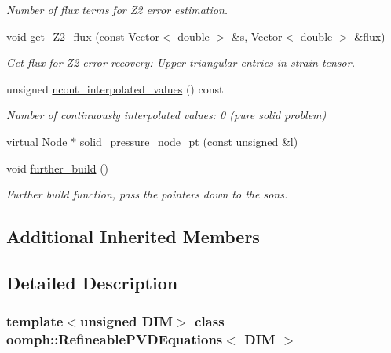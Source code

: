 \begin{DoxyCompactItemize}
\begin{DoxyCompactList}\small\item\em Number of \textquotesingle{}flux\textquotesingle{} terms for Z2 error estimation. \end{DoxyCompactList}\item 
void \hyperlink{classoomph_1_1RefineablePVDEquations_a1e51d4ea46f49c62441425bc3883a589}{get\+\_\+\+Z2\+\_\+flux} (const \hyperlink{classoomph_1_1Vector}{Vector}$<$ double $>$ \&\hyperlink{cfortran_8h_ab7123126e4885ef647dd9c6e3807a21c}{s}, \hyperlink{classoomph_1_1Vector}{Vector}$<$ double $>$ \&flux)
\begin{DoxyCompactList}\small\item\em Get \textquotesingle{}flux\textquotesingle{} for Z2 error recovery\+: Upper triangular entries in strain tensor. \end{DoxyCompactList}\item 
unsigned \hyperlink{classoomph_1_1RefineablePVDEquations_af30374314ac9d9805702d9fde7cb1cef}{ncont\+\_\+interpolated\+\_\+values} () const
\begin{DoxyCompactList}\small\item\em Number of continuously interpolated values\+: 0 (pure solid problem) \end{DoxyCompactList}\item 
virtual \hyperlink{classoomph_1_1Node}{Node} $\ast$ \hyperlink{classoomph_1_1RefineablePVDEquations_a765247d85587d85802c656ca5d8d9180}{solid\+\_\+pressure\+\_\+node\+\_\+pt} (const unsigned \&l)
\item 
void \hyperlink{classoomph_1_1RefineablePVDEquations_a936bab952ddbad5093cb7ee80d0019b5}{further\+\_\+build} ()
\begin{DoxyCompactList}\small\item\em Further build function, pass the pointers down to the sons. \end{DoxyCompactList}\end{DoxyCompactItemize}
\subsection*{Additional Inherited Members}


\subsection{Detailed Description}
\subsubsection*{template$<$unsigned D\+IM$>$\newline
class oomph\+::\+Refineable\+P\+V\+D\+Equations$<$ D\+I\+M $>$}

